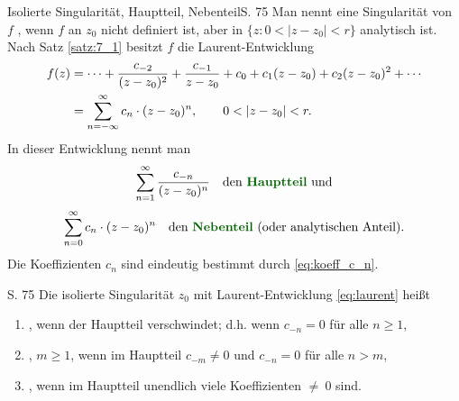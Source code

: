 \begin{bemerkung}{Isolierte Singularität, Hauptteil, Nebenteil}{S. 75}
  Man nennt eine Singularität von $f$ , wenn $f$ an $z_0$ nicht definiert ist, aber in $\{ z : 0 < |z-z_0| < r \}$ analytisch ist.
  Nach Satz \ref{satz:7_1} besitzt $f$ die Laurent-Entwicklung
  \begin{align}
    f(z)
     &= \cdots
       + \frac{c_{-2}}{(z-z_0)^2}
       + \frac{c_{-1}}{z-z_0}
       + c_0
       + c_1 (z-z_0)
       + c_2 (z-z_0)^2
       + \cdots
       \notag\\
     &= \sum_{n=-\infty}^{\infty} c_n \cdot (z-z_0)^n
     , \qquad 0 < |z-z_0| < r .
     \label{eq:laurent}
  \end{align}
  In dieser Entwicklung nennt man
  \begin{align*}
    \sum_{n=1}^{\infty} \frac{c_{-n}}{(z-z_0)^n}
    \quad
    \text{den \begriff{Hauptteil} und}
  \end{align*}
  \begin{align*}
    \sum_{n=0}^{\infty} c_n \cdot (z-z_0)^n
    \quad
    \text{den \begriff{Nebenteil} (oder analytischen Anteil).}
  \end{align*}
  Die Koeffizienten $c_n$ sind eindeutig bestimmt durch \eqref{eq:koeff_c_n}.
\end{bemerkung}

\begin{definition}{S. 75}
  \label{def:7_1}
  Die isolierte Singularität $z_0$ mit Laurent-Entwicklung \eqref{eq:laurent} heißt
  \begin{enumerate}[label=\alph*)]
    \item {}, wenn der Hauptteil verschwindet; d.h. wenn $c_{-n} = 0$ für alle $n \geq 1$,
    \item {}, $m \geq 1$, wenn im Hauptteil $c_{-m} \neq 0$ und $c_{-n} = 0$ für alle $n > m$,
    \item {}, wenn im Hauptteil unendlich viele Koeffizienten $\neq~0$ sind.
  \end{enumerate}
\end{definition}

